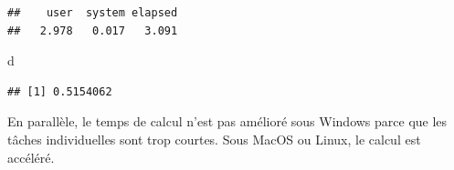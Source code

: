 \documentclass[
  12pt,
  french,
  a4paper,
  extrafontsizes,onecolumn,openright
  ]{memoir}
\newenvironment{Shaded}{\begin{snugshade}}{\end{snugshade}}
\newcommand{\ControlFlowTok}[1]{\textcolor[rgb]{0.13,0.29,0.53}{\textbf{#1}}}
\newcommand{\DecValTok}[1]{\textcolor[rgb]{0.00,0.00,0.81}{#1}}
\newcommand{\KeywordTok}[1]{\textcolor[rgb]{0.13,0.29,0.53}{\textbf{#1}}}
\newcommand{\NormalTok}[1]{#1}
\newcommand{\OperatorTok}[1]{\textcolor[rgb]{0.81,0.36,0.00}{\textbf{#1}}}
\newcommand{\StringTok}[1]{\textcolor[rgb]{0.31,0.60,0.02}{#1}}
\begin{document}
\begin{verbatim}
##    user  system elapsed 
##   2.978   0.017   3.091
\end{verbatim}

\begin{Shaded}
\begin{Highlighting}[]
\NormalTok{d}
\end{Highlighting}
\end{Shaded}

\begin{verbatim}
## [1] 0.5154062
\end{verbatim}

\normalsize

En parallèle, le temps de calcul n'est pas amélioré sous Windows parce que les tâches individuelles sont trop courtes.
Sous MacOS ou Linux, le calcul est accéléré.

\scriptsize

\begin{Shaded}
\end{Shaded}
\end{document}
